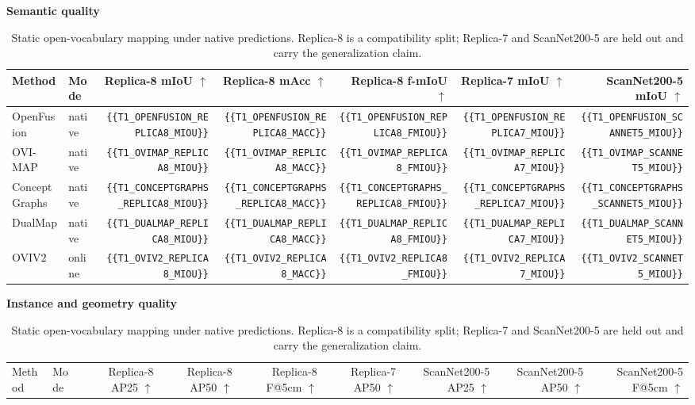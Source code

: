 
\begin{table}[t]
\centering
\caption{Static open-vocabulary mapping under native predictions. Replica-8 is a compatibility split; Replica-7 and ScanNet200-5 are held out and carry the generalization claim.}
\label{tab:static_mapping}
\small
\textbf{Semantic quality}\\
\begin{tabular}{llrrrrr}
\toprule
Method & Mode & Replica-8 mIoU $\uparrow$ & Replica-8 mAcc $\uparrow$ & Replica-8 f-mIoU $\uparrow$ & Replica-7 mIoU $\uparrow$ & ScanNet200-5 mIoU $\uparrow$ \\
\midrule
OpenFusion & native & \verb|{{T1_OPENFUSION_REPLICA8_MIOU}}| & \verb|{{T1_OPENFUSION_REPLICA8_MACC}}| & \verb|{{T1_OPENFUSION_REPLICA8_FMIOU}}| & \verb|{{T1_OPENFUSION_REPLICA7_MIOU}}| & \verb|{{T1_OPENFUSION_SCANNET5_MIOU}}| \\
OVI-MAP & native & \verb|{{T1_OVIMAP_REPLICA8_MIOU}}| & \verb|{{T1_OVIMAP_REPLICA8_MACC}}| & \verb|{{T1_OVIMAP_REPLICA8_FMIOU}}| & \verb|{{T1_OVIMAP_REPLICA7_MIOU}}| & \verb|{{T1_OVIMAP_SCANNET5_MIOU}}| \\
ConceptGraphs & native & \verb|{{T1_CONCEPTGRAPHS_REPLICA8_MIOU}}| & \verb|{{T1_CONCEPTGRAPHS_REPLICA8_MACC}}| & \verb|{{T1_CONCEPTGRAPHS_REPLICA8_FMIOU}}| & \verb|{{T1_CONCEPTGRAPHS_REPLICA7_MIOU}}| & \verb|{{T1_CONCEPTGRAPHS_SCANNET5_MIOU}}| \\
DualMap & native & \verb|{{T1_DUALMAP_REPLICA8_MIOU}}| & \verb|{{T1_DUALMAP_REPLICA8_MACC}}| & \verb|{{T1_DUALMAP_REPLICA8_FMIOU}}| & \verb|{{T1_DUALMAP_REPLICA7_MIOU}}| & \verb|{{T1_DUALMAP_SCANNET5_MIOU}}| \\
OVIV2 & online & \verb|{{T1_OVIV2_REPLICA8_MIOU}}| & \verb|{{T1_OVIV2_REPLICA8_MACC}}| & \verb|{{T1_OVIV2_REPLICA8_FMIOU}}| & \verb|{{T1_OVIV2_REPLICA7_MIOU}}| & \verb|{{T1_OVIV2_SCANNET5_MIOU}}| \\
\bottomrule
\end{tabular}
\par
\vspace{4pt}
\textbf{Instance and geometry quality}\\
\begin{tabular}{llrrrrrrr}
\toprule
Method & Mode & Replica-8 AP25 $\uparrow$ & Replica-8 AP50 $\uparrow$ & Replica-8 F@5cm $\uparrow$ & Replica-7 AP50 $\uparrow$ & ScanNet200-5 AP25 $\uparrow$ & ScanNet200-5 AP50 $\uparrow$ & ScanNet200-5 F@5cm $\uparrow$ \\

\end{tabular}
\end{table}
